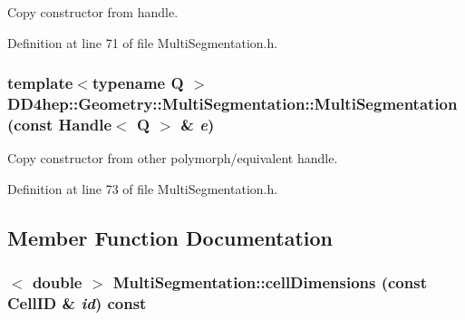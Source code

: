 Copy constructor from handle. 

Definition at line 71 of file MultiSegmentation.h.\hypertarget{class_d_d4hep_1_1_geometry_1_1_multi_segmentation_a2f828b0c929bc0e37db579c1dd73b86d}{
\subsubsection[{MultiSegmentation}]{\setlength{\rightskip}{0pt plus 5cm}template$<$typename Q $>$ DD4hep::Geometry::MultiSegmentation::MultiSegmentation (const {\bf Handle}$<$ Q $>$ \& {\em e})}}
\label{class_d_d4hep_1_1_geometry_1_1_multi_segmentation_a2f828b0c929bc0e37db579c1dd73b86d}


Copy constructor from other polymorph/equivalent handle. 

Definition at line 73 of file MultiSegmentation.h.

\subsection{Member Function Documentation}
\hypertarget{class_d_d4hep_1_1_geometry_1_1_multi_segmentation_aab6ca6c547f06eff88d6d95260f6617c}{
\subsubsection[{cellDimensions}]{$<$ double $>$ MultiSegmentation::cellDimensions (const CellID \& {\em id}) const}}
\label{class_d_d4hep_1_1_geometry_1_1_multi_segmentation_aab6ca6c547f06eff88d6d95260f6617c}


